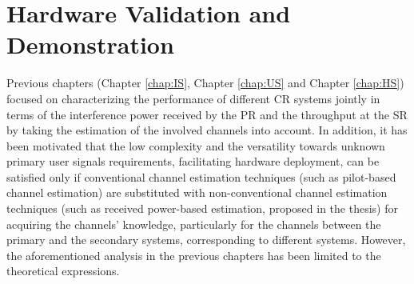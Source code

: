 \chapter{Hardware Validation and Demonstration}
\label{chap:HVD}

Previous chapters (Chapter \ref{chap:IS}, Chapter \ref{chap:US} and Chapter \ref{chap:HS}) focused on characterizing the performance of different CR systems jointly in terms of the interference power received by the PR and the throughput at the SR by taking the estimation of the involved channels into account. In addition, it has been motivated that the low complexity and the versatility towards unknown primary user signals requirements, facilitating hardware deployment, can be satisfied only if conventional channel estimation techniques (such as pilot-based channel estimation) are substituted with non-conventional channel estimation techniques (such as received power-based estimation, proposed in the thesis) for acquiring the channels' knowledge, particularly for the channels between the primary and the secondary systems, corresponding to different systems. However, the aforementioned analysis in the previous chapters has been limited to the theoretical expressions. 


